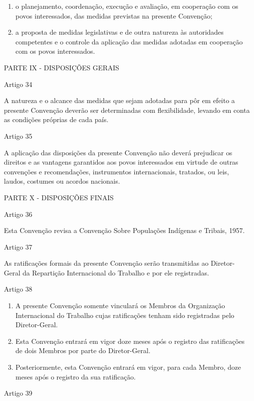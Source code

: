 \documentclass[
]{book}
\begin{document}
\begin{enumerate}
\def\labelenumi{\alph{enumi})}
\item
  o planejamento, coordenação, execução e avaliação, em cooperação com os povos interessados, das medidas previstas na presente Convenção;
\item
  a proposta de medidas legislativas e de outra natureza às autoridades competentes e o controle da aplicação das medidas adotadas em cooperação com os povos interessados.
\end{enumerate}

PARTE IX - DISPOSIÇÕES GERAIS

Artigo 34

A natureza e o alcance das medidas que sejam adotadas para pôr em efeito a presente Convenção deverão ser determinadas com flexibilidade, levando em conta as condições próprias de cada país.

Artigo 35

A aplicação das disposições da presente Convenção não deverá prejudicar os direitos e as vantagens garantidos aos povos interessados em virtude de outras convenções e recomendações, instrumentos internacionais, tratados, ou leis, laudos, costumes ou acordos nacionais.

PARTE X - DISPOSIÇÕES FINAIS

Artigo 36

Esta Convenção revisa a Convenção Sobre Populações Indígenas e Tribais, 1957.

Artigo 37

As ratificações formais da presente Convenção serão transmitidas ao Diretor-Geral da Repartição Internacional do Trabalho e por ele registradas.

Artigo 38

\begin{enumerate}
\def\labelenumi{\arabic{enumi}.}
\item
  A presente Convenção somente vinculará os Membros da Organização Internacional do Trabalho cujas ratificações tenham sido registradas pelo Diretor-Geral.
\item
  Esta Convenção entrará em vigor doze meses após o registro das ratificações de dois Membros por parte do Diretor-Geral.
\item
  Posteriormente, esta Convenção entrará em vigor, para cada Membro, doze meses após o registro da sua ratificação.
\end{enumerate}

Artigo 39
\end{document}

